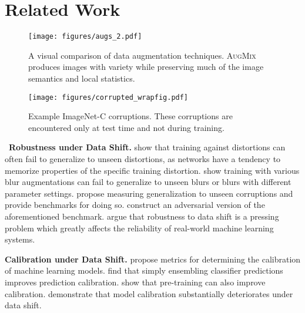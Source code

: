 \documentclass{article} \usepackage{iclr2020_conference,times}
\begin{document}
\section{Related Work}

\begin{figure}[t]
\centering
\texttt{[image: figures/augs\_2.pdf]}
\caption{A visual comparison of data augmentation techniques. \textsc{AugMix} produces images with variety while preserving much of the image semantics and local statistics.}
\end{figure}

\begin{wrapfigure}{R}{0.36\textwidth}
\vspace{-10pt}
\centering
\texttt{[image: figures/corrupted\_wrapfig.pdf]}
\caption{Example ImageNet-C corruptions. These corruptions are encountered only at test time and not during training.
}
\vspace{-20pt}
\end{wrapfigure}
\ \noindent\textbf{Robustness under Data Shift.} \cite{geirhos} show that training against distortions can often fail to generalize to unseen distortions, as networks have a tendency to memorize properties of the specific training distortion. \cite{igor} show training with various blur augmentations can fail to generalize to unseen blurs or blurs with different parameter settings.
\cite{hendrycks2019robustness} propose measuring generalization to unseen corruptions and provide benchmarks for doing so. \cite{uar} construct an adversarial version of the aforementioned benchmark. \cite{Gilmer2018MotivatingTR,gilmer2019discussion} argue that robustness to data shift is a pressing problem which greatly affects the reliability of real-world machine learning systems. 




\noindent\textbf{Calibration under Data Shift.}
\citet{kilian, oconnor} propose metrics for determining the calibration of machine learning models. \cite{lakshminarayanan2017simple} find that simply ensembling classifier predictions improves prediction calibration.
\cite{hendrycks2019pretrain} show that pre-training can also improve calibration. \cite{ovadia2019can} demonstrate that model calibration substantially deteriorates under data shift.
\end{document}

